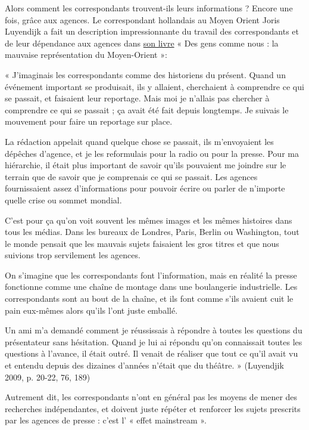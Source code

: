 Alors comment les correspondants trouvent-ils leurs informations ?
Encore une fois, grâce aux agences. Le correspondant hollandais au Moyen
Orient Joris Luyendijk a fait un description impressionnante du travail
des correspondants et de leur dépendance aux agences dans
\href{https://www.amazon.com/People-Like-Us-Misrepresenting-Middle/dp/1593762569}{son
livre} « Des gens comme nous : la mauvaise représentation du
Moyen-Orient »:

« J'imaginais les correspondants comme des historiens du présent. Quand
un événement important se produisait, ils y allaient, cherchaient à
comprendre ce qui se passait, et faisaient leur reportage. Mais moi je
n'allais pas chercher à comprendre ce qui se passait ; ça avait été fait
depuis longtemps. Je suivais le mouvement pour faire un reportage sur
place.

La rédaction appelait quand quelque chose se passait, ils m'envoyaient
les dépêches d'agence, et je les reformulais pour la radio ou pour la
presse. Pour ma hiérarchie, il était plus important de savoir qu'ils
pouvaient me joindre sur le terrain que de savoir que je comprenais ce
qui se passait. Les agences fournissaient assez d'informations pour
pouvoir écrire ou parler de n'importe quelle crise ou sommet mondial.

C'est pour ça qu'on voit souvent les mêmes images et les mêmes histoires
dans tous les médias. Dans les bureaux de Londres, Paris, Berlin ou
Washington, tout le monde pensait que les mauvais sujets faisaient les
gros titres et que nous suivions trop servilement les agences.

On s'imagine que les correspondants font l'information, mais en réalité
la presse fonctionne comme une chaîne de montage dans une boulangerie
industrielle. Les correspondants sont au bout de la chaîne, et ils font
comme s'ils avaient cuit le pain eux-mêmes alors qu'ils l'ont juste
emballé.

Un ami m'a demandé comment je réussissais à répondre à toutes les
questions du présentateur sans hésitation. Quand je lui ai répondu qu'on
connaissait toutes les questions à l'avance, il était outré. Il venait
de réaliser que tout ce qu'il avait vu et entendu depuis des dizaines
d'années n'était que du théâtre. » (Luyendjik 2009, p. 20-22, 76, 189)

Autrement dit, les correspondants n'ont en général pas les moyens de
mener des recherches indépendantes, et doivent juste répéter et
renforcer les sujets prescrits par les agences de presse : c'est l' «
effet mainstream ».

